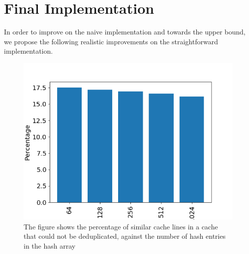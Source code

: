 \section{Final Implementation}
\label{sec:Final Implementation}
In order to improve on the naive implementation and towards the upper bound, we propose the following realistic improvements on the straightforward implementation.
\begin{figure}
    \includegraphics[width=\textwidth]{NumHashes.png}
    \caption[Missed Dedup Opportunity vs Hashes]{The figure shows the percentage of similar cache lines in a cache that could not be deduplicated, against the number of hash entries in the hash array}
    \label{fig:numhashes}
\end{figure}
